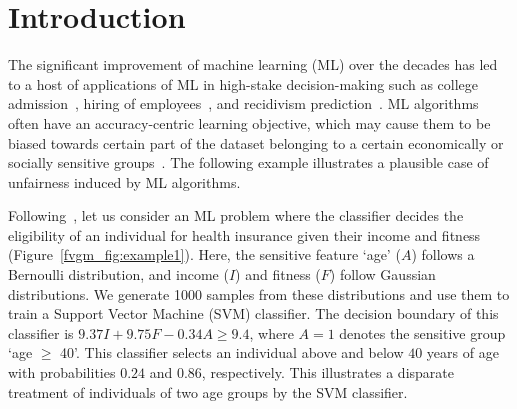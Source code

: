 \section{Introduction}
	The significant improvement of machine learning (ML) over the decades has led to a host of applications of ML in  high-stake decision-making such as college admission~\cite{martinez2021using}, hiring of employees~\cite{ajunwa2016hiring}, and recidivism prediction~\cite{tollenaar2013method,dressel2018accuracy}. ML algorithms often have an accuracy-centric learning objective, which may cause them to be biased towards certain part of the dataset belonging to a certain economically or socially sensitive groups~\cite{landy1978correlates,zliobaite2015relation,berk2019accuracy}.
	 The following example illustrates a plausible case of unfairness induced by ML algorithms. 
	\begin{example}\label{fvgm_example:intro}
		Following~\cite[Example 1.]{ghosh2020justicia}, let us consider an ML problem where the classifier decides the eligibility of an individual for health insurance given their income and fitness (Figure~\ref{fvgm_fig:example1}). Here, the sensitive feature `age' ($ A $) follows a Bernoulli distribution, and income ($ I $) and fitness ($ F $) follow Gaussian distributions. We generate 1000 samples from these distributions and use them to train a Support Vector Machine (SVM) classifier. The decision boundary of this classifier is $9.37I + 9.75F - 0.34A \ge 9.4$, where $A = 1$ denotes the sensitive group `age $ \ge $ 40'. This classifier selects an individual above and below $40$ years of age with probabilities $0.24$ and $0.86$, respectively. This illustrates a disparate treatment of individuals of two age groups by the SVM classifier. 
	\end{example}

